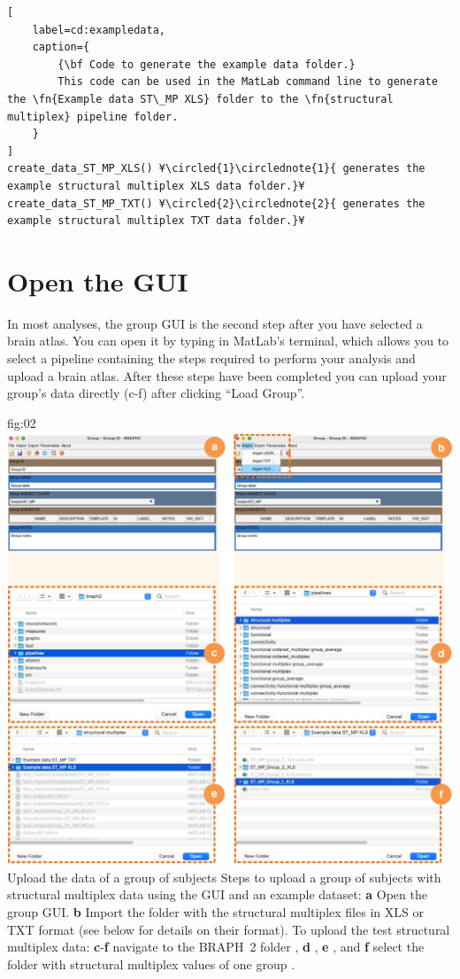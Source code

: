 \documentclass[justified]{tufte-handout}
\begin{document}
\begin{lstlisting}[
	label=cd:exampledata,
	caption={
		{\bf Code to generate the example data folder.}
		This code can be used in the MatLab command line to generate the \fn{Example data ST\_MP XLS} folder to the \fn{structural multiplex} pipeline folder.
	}
]
create_data_ST_MP_XLS() ¥\circled{1}\circlednote{1}{ generates the example structural multiplex XLS data folder.}¥
create_data_ST_MP_TXT() ¥\circled{2}\circlednote{2}{ generates the example structural multiplex TXT data folder.}¥
\end{lstlisting}

\section{Open the GUI}

In most analyses, the group GUI is the second step after you have selected a brain atlas. You can open it by typing  in MatLab's terminal, which allows you to select a pipeline containing the steps required to perform your analysis and upload a brain atlas. After these steps have been completed you can upload your group's data directly (c-f) after clicking ``Load Group''. 

	{fig:02}
	{
	\includegraphics{fig02.jpg}
	}
	{Upload the data of a group of subjects}
	{
	Steps to upload a group of subjects with structural multiplex data using the GUI and an example dataset: 
	{\bf a} Open the group GUI.
	{\bf b} Import the folder with the structural multiplex files in XLS or TXT format (see below for details on their format).
	To upload the test structural multiplex data:
	{\bf c}-{\bf f} navigate to the BRAPH~2 folder , {\bf d} ,  {\bf e} , and {\bf f} select the folder with structural multiplex values of one group .
	}
\end{document}
